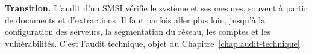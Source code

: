 \begin{boxinfo}
\textbf{Transition.} L'audit d'un SMSI vérifie le système et ses mesures,
souvent à partir de documents et d'extractions. Il faut parfois aller plus
loin, jusqu'à la configuration des serveurs, la segmentation du réseau,
les comptes et les vulnérabilités. C'est l'audit technique, objet du
Chapitre~\ref{chap:audit-technique}.
\end{boxinfo}
